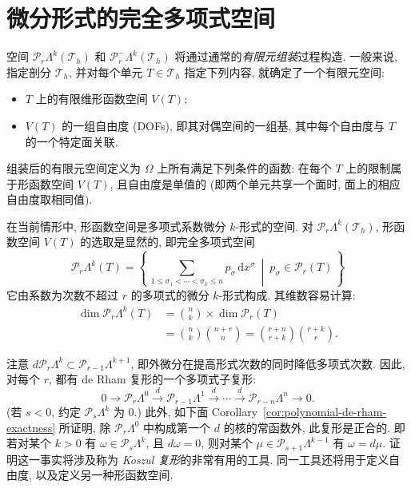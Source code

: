 \section{微分形式的完全多项式空间}\label{sec:complete-polynomial-forms}

空间 $\mathcal P_r\Lambda^k(\mathcal T_h)$ 和 $\mathcal P_r^-\Lambda^k(\mathcal T_h)$ 将通过通常的\emph{有限元组装}过程构造. 一般来说, 指定剖分 $\mathcal T_h$, 并对每个单元 $T\in\mathcal T_h$ 指定下列内容, 就确定了一个有限元空间:
\begin{itemize}
\item{$T$ 上的有限维形函数空间 $V(T)$;}
\item{$V(T)$ 的一组自由度 (DOFs), 即其对偶空间的一组基, 其中每个自由度与 $T$ 的一个特定面关联.}
\end{itemize}

组装后的有限元空间定义为 $\Omega$ 上所有满足下列条件的函数: 在每个 $T$ 上的限制属于形函数空间 $V(T)$, 且自由度是单值的 (即两个单元共享一个面时, 面上的相应自由度取相同值).

在当前情形中, 形函数空间是多项式系数微分 $k$-形式的空间. 对 $\mathcal P_r\Lambda^k(\mathcal T_h)$, 形函数空间 $V(T)$ 的选取是显然的, 即完全多项式空间
\[
\mathcal P_r\Lambda^k(T)=\left\{\,\sum_{1\leq\sigma_1<\cdots<\sigma_k\leq n}p_\sigma\,\mathrm{d}x^\sigma\ \middle|\ p_\sigma\in\mathcal P_r(T)\,\right\}
\]
它由系数为次数不超过 $r$ 的多项式的微分 $k$-形式构成. 其维数容易计算:
\begin{equation}\label{eq:complete-polynomial-form-dimension}
\begin{aligned}
\dim\mathcal P_r\Lambda^k(T)&=\binom nk\times\dim\mathcal P_r(T)\\
&=\binom nk\binom{n+r}n=\binom{r+n}{r+k}\binom{r+k}r.
\end{aligned}
\end{equation}

注意 $d\mathcal P_r\Lambda^k\subset\mathcal P_{r-1}\Lambda^{k+1}$, 即外微分在提高形式次数的同时降低多项式次数. 因此, 对每个 $r$, 都有 de Rham 复形的一个多项式子复形:
\[
0\to\mathcal P_r\Lambda^0\xrightarrow{d}\mathcal P_{r-1}\Lambda^1\xrightarrow{d}\cdots\xrightarrow{d}\mathcal P_{r-n}\Lambda^n\to0.
\]
(若 $s<0$, 约定 $\mathcal P_s\Lambda^k$ 为 $0$.) 此外, 如下面 Corollary~\ref{cor:polynomial-de-rham-exactness} 所证明, 除 $\mathcal P_r\Lambda^0$ 中构成第一个 $d$ 的核的常函数外, 此复形是正合的. 即若对某个 $k>0$ 有 $\omega\in\mathcal P_s\Lambda^k$, 且 $d\omega=0$, 则对某个 $\mu\in\mathcal P_{s+1}\Lambda^{k-1}$ 有 $\omega=d\mu$. 证明这一事实将涉及称为 \emph{Koszul 复形}的非常有用的工具. 同一工具还将用于定义自由度, 以及定义另一种形函数空间.

